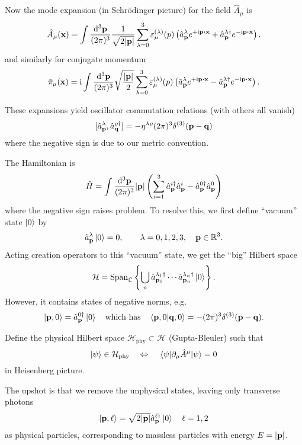 \documentclass[a4paper,11pt]{article}
\begin{document}
	Now the mode expansion (in Schr\"odinger picture) for the field $\hat A_\mu$ is
	\begin{equation*}
		\hat A_\mu (\vb x) = \int \ddk{\vb p}{3} \frac{1}{\sqrt{2 \abs{\vb p}}} \sum _{\lambda = 0}^3 \varepsilon ^{(\lambda)}_\mu(p) \left( \hat a _{\vb p}^\lambda e ^{+ \mathrm{i} \vb p \vdot \vb x} + \hat a^{\lambda\dagger}_{\vb p} e ^{- \mathrm{i} \vb p \vdot \vb x} \right).
	\end{equation*}
	and similarly for conjugate momentum
	\[
		\hat \pi_\mu(\vb x) = \mathrm{i} \int \ddk{\vb p}{3} \sqrt{\frac{\abs{\vb p}}{2}} \sum_{\lambda = 0}^3 \varepsilon ^{(\lambda)}_\mu(p) \left( \hat a ^{\lambda}_{\vb p} e ^{+ \mathrm{i} \vb p \vdot \vb x} - \hat a^{\lambda\dagger}_{\vb p} e ^{-\mathrm{i} \vb p \vdot \vb x} \right).
	\]
	
	These expansions yield oscillator commutation relations (with others all vanish)
	\[
		[\hat a ^{\lambda}_{\vb p}, \hat a ^{\rho\dagger}_{\vb q}] = - \eta ^{\lambda \rho} (2 \pi)^3 \delta ^{(3)}(\vb p - \vb q)
	\]
	where the negative sign is due to our metric convention.

	The Hamiltonian is 
	\[
		\hat H = \int \frac{\dd[3]{\vb p}}{(2\pi)^{3}} \abs{\vb p} \left( \sum _{i = 1}^3 \hat a ^{i\dagger}_{\vb p} \hat a^i _{\vb p} - \hat a ^{0 \dagger}_{\vb p} \hat a^0 _{\vb p} \right)
	\]
	where the negative sign raises problem. To resolve this, we first define ``vacuum'' state $\ket{0}$ by 
	\[
		\hat a ^{\lambda}_{\vb p} \ket{0} = 0, \qquad \lambda = 0,1,2,3, \quad \vb p \in \mathbb{R}^3.
	\]
	Acting creation operators to this ``vacuum'' state, we get the ``big'' Hilbert space 
	\[
		\mathcal{H} = \operatorname{Span} _{\mathbb{C}}\left\{ \bigcup_n \hat a^{\lambda_1\dagger}_{\vb p_1} \cdots \hat a^{\lambda_n\dagger} _{\vb p_n} \ket{0}\right\}.
	\]
	However, it contains states of negative norms, e.g. 
	\[
		\ket{\vb p, 0} = \hat a^{0\dagger} _{\vb p}\ket{0} \quad \text{which has} \quad \braket{\vb p, 0}{\vb q, 0} = - (2 \pi)^3 \delta ^{(3)}(\vb p - \vb q).
	\]
	
	Define the physical Hilbert space $\mathcal{H}_{\text{phy}} \subset \mathcal{H}$ (Gupta-Bleuler) such that 
	\[
		\ket{\psi} \in \mathcal{H}_{\text{phy}} \quad \Leftrightarrow \quad \mel{\psi}{\partial_\mu \hat A^\mu}{\psi} = 0
	\]
	in Heisenberg picture.

	The upshot is that we remove the unphysical states, leaving only transverse photons
	\[
		\ket{\vb p, \ell} = \sqrt{2 \abs{\vb p}} \hat a^{\ell\dagger}_{\vb p} \ket{0} \quad \ell = 1,2
	\]
	as physical particles, corresponding to massless particles with energy $E = \abs{\vb p}$.
\end{document}
